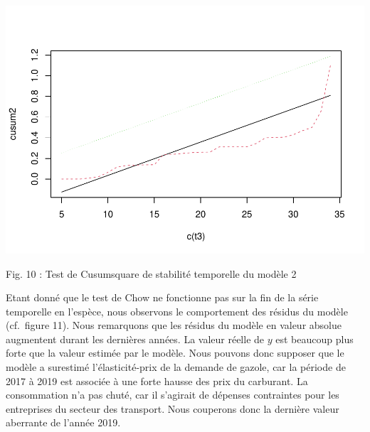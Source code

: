 \documentclass[
]{article}
\begin{document}
{{\begin{center}\includegraphics[width=0.7\linewidth,height=0.7\textheight]{Projet_econometrie_II_files/figure-latex/unnamed-chunk-11-1} \end{center}

Fig. 10 : Test de Cusumsquare de stabilité temporelle du modèle 2

Etant donné que le test de Chow ne fonctionne pas sur la fin de la série
temporelle en l'espèce, nous observons le comportement des résidus du
modèle (cf.~figure 11). Nous remarquons que les résidus du modèle en
valeur absolue augmentent durant les dernières années. La valeur réelle
de \(y\) est beaucoup plus forte que la valeur estimée par le modèle.
Nous pouvons donc supposer que le modèle a surestimé l'élasticité-prix
de la demande de gazole, car la période de 2017 à 2019 est associée à
une forte hausse des prix du carburant. La consommation n'a pas chuté,
car il s'agirait de dépenses contraintes pour les entreprises du secteur
des transport. Nous couperons donc la dernière valeur aberrante de
l'année 2019.

}}
\end{document}
